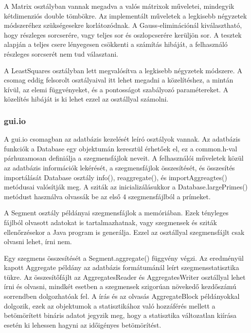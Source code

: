 A Matrix osztályban vannak megadva a valós mátrixok műveletei, mindegyik kétdimenziós double tömbökre.
Az implementált műveletek a legkisebb négyzetek módszeréhez szükségesekre korlátozódnak.
A Gauss-eliminációnál kiválasztható, hogy részleges sorcserére, vagy teljes sor és oszlopcserére kerüljön sor.
A tesztek alapján a teljes csere lényegesen csökkenti a számítás hibáját, a felhasználó részleges sorcserét nem tud választani.

A LeastSquares osztályban lett megvalósítva a legkisebb négyzetek módszere. A csomag eddig felsorolt osztályaival itt lehet megadni a közelítéshez, a mintán kívül, az elemi függvényeket, és a pontosságot szabályozó paramétereket.
A közelítés hibáját is ki lehet ezzel az osztállyal számolni.

\subsubsection{gui.io}

A gui.io csomagban az adatbázis kezelését leíró osztályok vannak.
Az adatbázis funkciók a Database egy objektumán keresztül érhetőek el, ez a common.h-val párhuzamosan definiálja a szegmensfájlok neveit.
A felhasználói műveletek közül az adatbázis információk lekérését, a szegmensfájlok összesítését, és összesítés importálását Database osztály info(), reaggregate(), és importAggreagtes() metódusai
valósítják meg.
A sziták az inicializálásukkor a Database.largePrimes() metódust használva olvassák be az első 4 szegmensfájlból a prímeket.

A Segment osztály példányai szegmensfájlok a memóriában.
Ezek tényleges fájlból olvasott adatokat is tartalmazhatnak, vagy szegmensek és sziták ellenőrzésekor a Java program is generálja.
Ezzel az osztállyal szegmensfájlt csak olvasni lehet, írni nem.

Egy szegmens összesítését a Segment.aggregate() függvény végzi.
Az eredményül kapott Aggregate példány az adatbázis formátumánál leírt szegmensstatisztika tükre.
Az összesítőfájlt az AggregatesReader és AggregatesWriter osztállyal lehet írni és olvasni, mindkét esetben a szegmensek szigorúan növekedő kezdőszámú sorrendben dolgozhatóak fel.
A írás és az olvasás AggregateBlock példányokkal dolgozik, ezek az objektumok a statisztikához való hozzáférés mellett a betömörített bináris adatot jegyzik meg, hogy a statisztika változatlan kiírása esetén ki lehessen hagyni az időigényes betömörítést.

